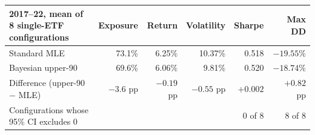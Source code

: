 \begin{tabular}{lrrrrr}\toprule
2017--22, mean of 8 single-ETF configurations & Exposure & Return & Volatility & Sharpe & Max DD\\\midrule
Standard MLE & 73.1\% & 6.25\% & 10.37\% & 0.518 & $-19.55\%$ \\
Bayesian upper-90 & 69.6\% & 6.06\% & 9.81\% & 0.520 & $-18.74\%$ \\
\midrule
Difference (upper-90 $-$ MLE) & $-3.6$ pp & $-0.19$ pp & $-0.55$ pp & $+0.002$ & $+0.82$ pp \\
Configurations whose 95\% CI excludes 0 & & & & 0 of 8 & 8 of 8 \\
\bottomrule\end{tabular}
